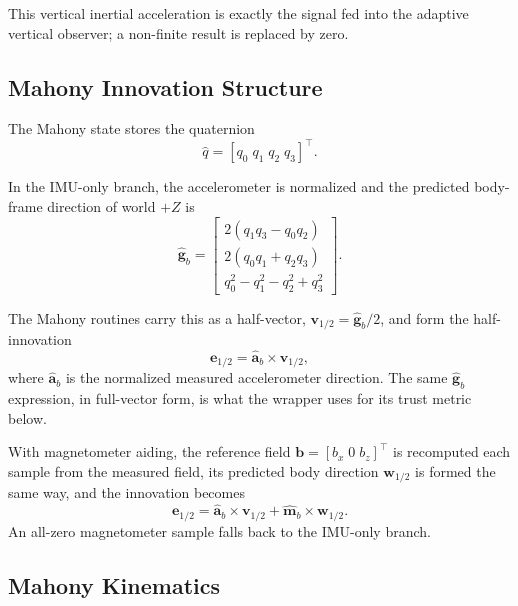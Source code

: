 \documentclass[conference]{IEEEtran}
\newcommand{\vct}[1]{\bm{#1}}
\begin{document}
    This vertical inertial acceleration is exactly the signal fed into the
    adaptive vertical observer; a non-finite result is replaced by zero.

    \subsection{Mahony Innovation Structure}

    The Mahony state stores the quaternion
    \begin{equation}
        \hat{q} = [q_0\;q_1\;q_2\;q_3]^\top .
    \end{equation}

    In the IMU-only branch, the accelerometer is normalized and the predicted
    body-frame direction of world \(+Z\) is
    \begin{equation}
        \hat{\vct{g}}_b =
        \begin{bmatrix}
            2(q_1 q_3 - q_0 q_2)\\
            2(q_0 q_1 + q_2 q_3)\\
            q_0^2 - q_1^2 - q_2^2 + q_3^2
        \end{bmatrix}.
    \end{equation}

    The Mahony routines carry this as a half-vector,
    \(\vct{v}_{1/2}=\hat{\vct{g}}_b/2\), and form the half-innovation
    \begin{equation}
        \vct{e}_{1/2} = \hat{\vct{a}}_b \times \vct{v}_{1/2},
    \end{equation}
    where \(\hat{\vct{a}}_b\) is the normalized measured accelerometer
    direction. The same \(\hat{\vct{g}}_b\) expression, in full-vector form, is
    what the wrapper uses for its trust metric below.

    With magnetometer aiding, the reference field \(\vct{b}=[b_x\;0\;b_z]^\top\)
    is recomputed each sample from the measured field, its predicted body
    direction \(\vct{w}_{1/2}\) is formed the same way, and the innovation
    becomes
    \begin{equation}
        \vct{e}_{1/2}
        = \hat{\vct{a}}_b \times \vct{v}_{1/2}
        + \hat{\vct{m}}_b \times \vct{w}_{1/2}.
    \end{equation}
    An all-zero magnetometer sample falls back to the IMU-only branch.

    \subsection{Mahony Kinematics}
\end{document}
